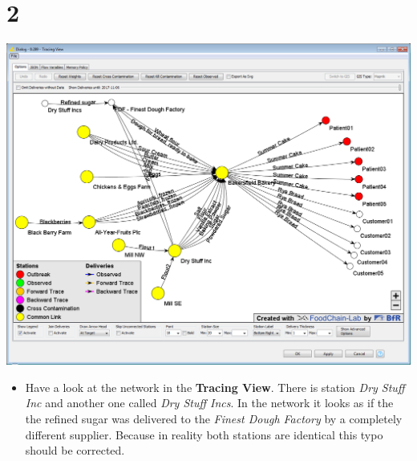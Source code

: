 \documentclass[10pt]{beamer}
\begin{document}
\section{2}
\begin{frame}
	\begin{center}
			\includegraphics[height=0.6\textheight]{2.png}
	\end{center}
	\begin{itemize}
		\item Have a look at the network in the \textbf{Tracing View}. There is station \textit{Dry Stuff Inc} and another one called \textit{Dry Stuff Incs}. In the network it looks as if the the refined sugar was delivered to the \textit{Finest Dough Factory} by a completely different supplier. Because in reality both stations are identical this typo should be corrected. 
	\end{itemize}
\end{frame}
\end{document}
